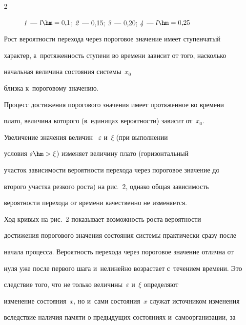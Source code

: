 \begin{multicols}{2}
\begin{figure}
\begin{minipage}[t]{79mm}
{\textit{1}~--- $l\hm=0{,}1$; \textit{2}~--- 0,15; \textit{3}~--- 0,20; \textit{4}~--- $l\hm=0{,}25$}


\end{minipage}


\vspace*{6pt}


\end{figure}





  Рост вероятности перехода через пороговое значение имеет ступенчатый 


характер, а~про\-тя\-жен\-ность ступени во времени зависит от того, насколько 


начальная величина со\-сто\-яния сис\-те\-мы~$x_0$


 \mbox{близка} к~пороговому значению. 


Процесс достижения порогового значения имеет протяженное во времени 


плато, величина которого (в~единицах ве\-ро\-ят\-ности) зависит от~$x_0$.


  


  Увеличение значения величин ~$\varepsilon$ и~$\xi$ (при выполнении 


условия $\varepsilon \hm >\xi$) изменяет величину плато (горизонтальный 


участок зависимости ве\-ро\-ят\-ности перехода через пороговое значение до 


\mbox{второго} участка резкого рос\-та) на рис.~2, однако общая за\-ви\-си\-мость 


ве\-ро\-ят\-ности перехода от времени качественно не изменяется.


  


  Ход кривых на рис.~2 показывает возможность роста вероятности 


достижения порогового значения состояния системы практически сразу после 


начала процесса. Вероятность перехода через пороговое значение отлична от 


нуля уже после первого шага и~нелинейно возрастает с~течением времени. Это 


следствие того, что не только величины~$\varepsilon$ и~$\xi$ определяют 


изменение состояния~$x$, но и~сами состояния~$x$ служат источником изменения 


вследствие наличия памяти о предыдущих состояниях и~самоорганизации, за 



\end{multicols}
